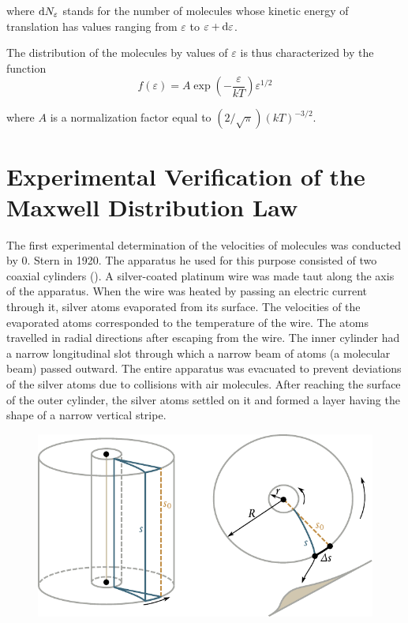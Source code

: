 \noindent
where $\mathrm{d} N_{\varepsilon}$ stands for the number of molecules whose kinetic energy of translation has values ranging from $\varepsilon$ to $\varepsilon+\mathrm{d}\varepsilon$.

The distribution of the molecules by values of $\varepsilon$ is thus characterized by the function
\begin{equation}\label{eq:11_73}
	f(\varepsilon) = A  \exp\left(-\frac{\varepsilon}{kT}\right) \varepsilon^{1/2}
\end{equation}

\noindent
where $A$ is a normalization factor equal to $(2/\sqrt{\pi}) (kT)^{-3/2}$.

\section{Experimental Verification of the Maxwell Distribution Law}\label{sec:11_7}

The first experimental determination of the velocities of molecules was conducted by 0. Stern in 1920. The apparatus he used for this purpose consisted of two coaxial cylinders (). A silver-coated platinum wire was made taut along the axis of the apparatus. When the wire was heated by passing an electric current through it, silver atoms evaporated from its surface. The velocities of the evaporated atoms corresponded to the temperature of the wire. The atoms travelled in radial directions after escaping from the wire. The inner cylinder had a narrow longitudinal slot through which a narrow beam of atoms (a molecular beam) passed outward. The entire apparatus was evacuated to prevent deviations of the silver atoms due to collisions with air molecules. After reaching the surface of the outer cylinder, the silver atoms settled on it and formed a layer having the shape of a narrow vertical stripe.

\begin{figure}[t]
	\begin{center}
		\includegraphics[scale=1.0]{figures/ch_11/fig_11_20.pdf}
		\caption[]{}
		\label{fig:11_20}
	\end{center}
	\vspace{-0.6cm}
\end{figure}

